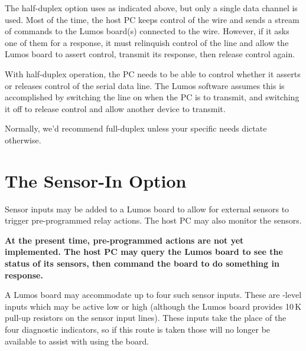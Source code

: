 \documentclass[letterpaper,twoside,onecolumn,openright,final]{memoir}
\begin{document}
The half-duplex option uses  as indicated above, but only a single data channel is used.  Most of the time,
the host PC keeps control of the wire and sends a stream of commands to the Lumos board(s) connected
to the wire.  However, if it asks one of them for a response, it must relinquish control of the line
and allow the Lumos board to assert control, transmit its response, then release control again.

With half-duplex operation, the PC needs to be able to control whether it asserts or releases control
of the serial data line.  The Lumos software assumes this is accomplished by switching the  
line on when the PC is to transmit, and switching it off to release control and allow another device to
transmit.

Normally, we'd recommend full-duplex unless your specific needs dictate otherwise.

\section{The Sensor-In Option}
Sensor inputs  may be added to a Lumos board to allow for external
sensors to trigger pre-programmed relay actions.  The host PC may also monitor the
sensors.

{\bfseries At the present time, pre-programmed actions are not 
yet implemented.  The host PC
may query the Lumos board to see the status of its sensors, then command the board to do
something in response.}

A Lumos board may accommodate up to four such sensor inputs.  These are -level inputs
which may be active low or high (although the Lumos board provides 10\,K pull-up resistors on the
sensor input lines).  These inputs take the place of the four diagnostic  indicators,
so if this route is taken those will no longer be available to assist with using the board.
\end{document}
